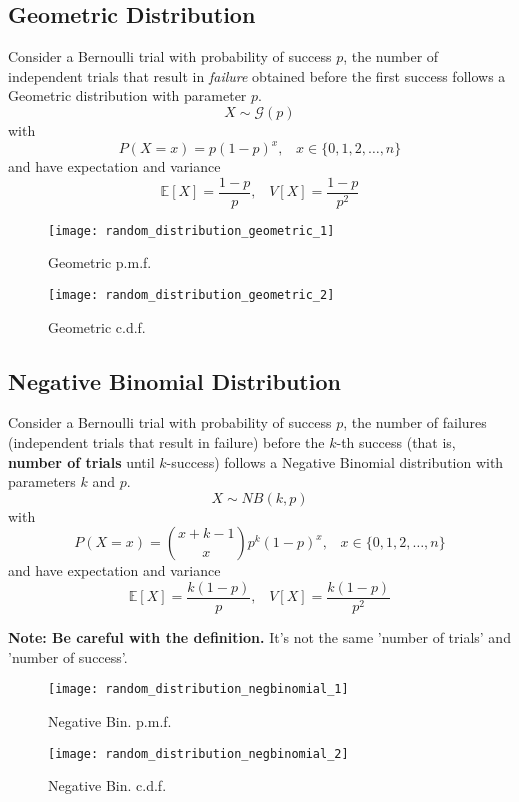 \subsection{Geometric Distribution}
Consider a Bernoulli trial with probability of success $p$, the number of independent trials that result in \textit{failure} obtained before 
the first success follows a Geometric distribution with parameter $p$.
\[ X \sim \mathcal{G}(p)\]
with
\[ P(X=x) = p(1-p)^x,\;\;\; x \in \{0,1,2,\dots,n\} \]
and have expectation and variance
\[ \mathbb{E}[X] = \frac{1-p}{p},\;\;\; V[X] = \frac{1-p}{p^2} \]

\begin{figure}[!ht]
    \begin{minipage}{0.45\linewidth}
      \texttt{[image: random\_distribution\_geometric\_1]}
      \caption{Geometric p.m.f.}
    \end{minipage}
    \hfill
    \begin{minipage}{0.45\linewidth}
      \texttt{[image: random\_distribution\_geometric\_2]}
      \caption{Geometric c.d.f.}
    \end{minipage}
\end{figure}

\subsection{Negative Binomial Distribution}
Consider a Bernoulli trial with probability of success $p$, the number of failures (independent trials that result in failure) before the $k$-th success 
(that is, \textbf{number of trials} until $k$-success) follows a Negative Binomial distribution with parameters $k$ and $p$.
\[ X \sim NB(k,p)\]
with
\[ P(X=x) = \binom{x+k-1}{x} p^k(1-p)^x,\;\;\; x \in \{0,1,2,\dots,n\} \]
and have expectation and variance
\[ \mathbb{E}[X] = \frac{k(1-p)}{p},\;\;\; V[X] = \frac{k(1-p)}{p^2} \]

\textbf{Note: Be careful with the definition.} It's not the same 'number of trials' and 'number of success'.

\begin{figure}[!ht]
    \begin{minipage}{0.45\linewidth}
      \texttt{[image: random\_distribution\_negbinomial\_1]}
      \caption{Negative Bin. p.m.f.}
    \end{minipage}
    \hfill
    \begin{minipage}{0.45\linewidth}
      \texttt{[image: random\_distribution\_negbinomial\_2]}
      \caption{Negative Bin. c.d.f.}
    \end{minipage}
\end{figure}


